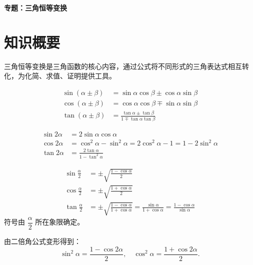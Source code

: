\documentclass[11pt]{ctexrep}
\begin{document}
\begin{center}
    {\Large\bfseries 专题：三角恒等变换}
\end{center}

\section*{知识概要}

三角恒等变换是三角函数的核心内容，通过公式将不同形式的三角表达式相互转化，为化简、求值、证明提供工具。

\begin{definition}[两角和与差的三角公式]
    \begin{align*}
        \sin(\alpha \pm \beta) &= \sin\alpha\cos\beta \pm \cos\alpha\sin\beta \\
        \cos(\alpha \pm \beta) &= \cos\alpha\cos\beta \mp \sin\alpha\sin\beta \\
        \tan(\alpha \pm \beta) &= \frac{\tan\alpha \pm \tan\beta}{1 \mp \tan\alpha\tan\beta}
    \end{align*}
\end{definition}

\begin{definition}[二倍角公式]
    \begin{align*}
        \sin 2\alpha &= 2\sin\alpha\cos\alpha \\
        \cos 2\alpha &= \cos^2\alpha - \sin^2\alpha = 2\cos^2\alpha - 1 = 1 - 2\sin^2\alpha \\
        \tan 2\alpha &= \frac{2\tan\alpha}{1 - \tan^2\alpha}
    \end{align*}
\end{definition}

\begin{definition}[半角公式]
    \begin{align*}
        \sin\frac{\alpha}{2} &= \pm\sqrt{\frac{1 - \cos\alpha}{2}} \\
        \cos\frac{\alpha}{2} &= \pm\sqrt{\frac{1 + \cos\alpha}{2}} \\
        \tan\frac{\alpha}{2} &= \pm\sqrt{\frac{1 - \cos\alpha}{1 + \cos\alpha}} = \frac{\sin\alpha}{1 + \cos\alpha} = \frac{1 - \cos\alpha}{\sin\alpha}
    \end{align*}
    符号由 $\dfrac{\alpha}{2}$ 所在象限确定。
\end{definition}

\begin{property}[降幂公式]
    由二倍角公式变形得到：
    \[
        \sin^2\alpha = \frac{1 - \cos 2\alpha}{2}, \quad \cos^2\alpha = \frac{1 + \cos 2\alpha}{2}.
    \]
\end{property}
\end{document}
